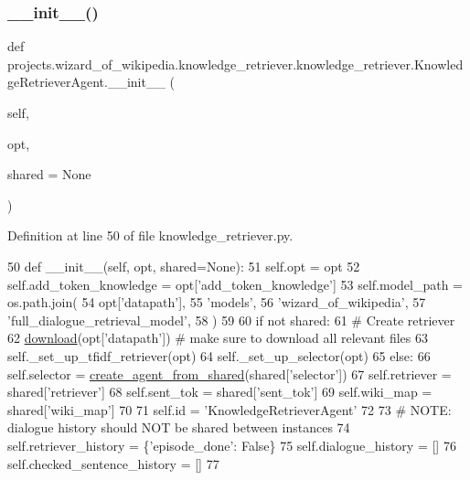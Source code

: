 \subsubsection{\texorpdfstring{\+\_\+\+\_\+init\+\_\+\+\_\+()}{\_\_init\_\_()}}
{\footnotesize\ttfamily def projects.\+wizard\+\_\+of\+\_\+wikipedia.\+knowledge\+\_\+retriever.\+knowledge\+\_\+retriever.\+Knowledge\+Retriever\+Agent.\+\_\+\+\_\+init\+\_\+\+\_\+ (\begin{DoxyParamCaption}\item[{}]{self,  }\item[{}]{opt,  }\item[{}]{shared = {\ttfamily None} }\end{DoxyParamCaption})}



Definition at line 50 of file knowledge\+\_\+retriever.\+py.


\begin{DoxyCode}
50     \textcolor{keyword}{def }\_\_init\_\_(self, opt, shared=None):
51         self.opt = opt
52         self.add\_token\_knowledge = opt[\textcolor{stringliteral}{'add\_token\_knowledge'}]
53         self.model\_path = os.path.join(
54             opt[\textcolor{stringliteral}{'datapath'}],
55             \textcolor{stringliteral}{'models'},
56             \textcolor{stringliteral}{'wizard\_of\_wikipedia'},
57             \textcolor{stringliteral}{'full\_dialogue\_retrieval\_model'},
58         )
59 
60         \textcolor{keywordflow}{if} \textcolor{keywordflow}{not} shared:
61             \textcolor{comment}{# Create retriever}
62             \hyperlink{namespaceparlai_1_1zoo_1_1wizard__of__wikipedia_1_1knowledge__retriever_a106476a619c671f1333e4de41ee883b6}{download}(opt[\textcolor{stringliteral}{'datapath'}])  \textcolor{comment}{# make sure to download all relevant files}
63             self.\_set\_up\_tfidf\_retriever(opt)
64             self.\_set\_up\_selector(opt)
65         \textcolor{keywordflow}{else}:
66             self.selector = \hyperlink{namespaceparlai_1_1core_1_1agents_aa5af5dd1d2f9da491b60348d479b849f}{create\_agent\_from\_shared}(shared[\textcolor{stringliteral}{'selector'}])
67             self.retriever = shared[\textcolor{stringliteral}{'retriever'}]
68             self.sent\_tok = shared[\textcolor{stringliteral}{'sent\_tok'}]
69             self.wiki\_map = shared[\textcolor{stringliteral}{'wiki\_map'}]
70 
71         self.id = \textcolor{stringliteral}{'KnowledgeRetrieverAgent'}
72 
73         \textcolor{comment}{# NOTE: dialogue history should NOT be shared between instances}
74         self.retriever\_history = \{\textcolor{stringliteral}{'episode\_done'}: \textcolor{keyword}{False}\}
75         self.dialogue\_history = []
76         self.checked\_sentence\_history = []
77 
\end{DoxyCode}


